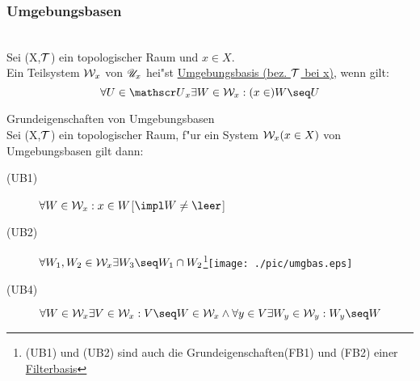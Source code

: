 \subsubsection{Umgebungsbasen}

\begin{definition}\label{2.11}\\
Sei (X,$\mathcal T$) ein topologischer Raum und $x\in X$.\\
Ein Teilsystem ${\mathcal W}_{x}$ von ${\mathscr U}_{x}$ hei"st \ul{Umgebungsbasis (bez. $\mathcal T$ bei x)}, wenn gilt:
$$\forall U\in\umg{U}{x}\exists W\in\umgbas{W}{x}:(x\in )W\seq U$$
\end{definition}

\begin{satz}\label{2.12}{\sc Grundeigenschaften von Umgebungsbasen}\\
Sei (X,$\mathcal T$) ein topologischer Raum, f"ur ein System ${\mathcal W}_{x} (x\in X)$ von Umgebungsbasen gilt dann:
\begin{description}
\item[(UB1)] $\forall W\in{\mathcal W}_{x}:x\in W$[$\impl W\neq\leer$]
\vspace*{-1.5cm}\item[(UB2)] $\forall W_1,W_2\in\umgbas{W}{x}\exists W_3\seq W_1\cap W_2$\footnote{(UB1) und (UB2) sind auch die Grundeigenschaften(FB1) und (FB2) einer \ul{Filterbasis}}\texttt{[image: ./pic/umgbas.eps]}\\
\item[(UB4)] $\forall W\in \umgbas{W}{x}\exists V\in\umgbas{W}{x}:V\seq W\in\umgbas{W}{x} \wedge\forall y\in V\exists W_y\in\umgbas{W}{y}:W_y\seq W$
\end{description}
\end{satz}


